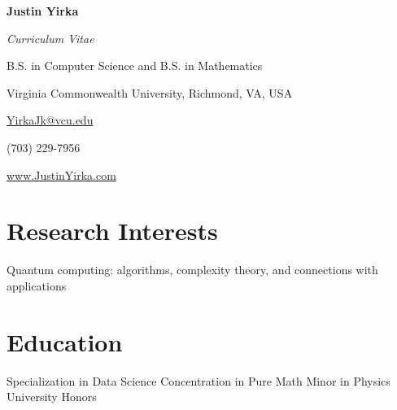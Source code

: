 \documentclass[11pt,letterpaper,serif]{moderncv}
\begin{document}
	
	
\thispagestyle{firstpage}

\begin{center}
	{\huge\textbf{Justin Yirka}}
	
	\textit{Curriculum Vitae}
	
	B.S. in Computer Science and B.S. in Mathematics
	
	Virginia Commonwealth University, Richmond, VA, USA
	\vspace{\baselineskip}
	
	\href{mailto:yirkajk@vcu.edu}{YirkaJk@vcu.edu}
	
	(703) 229-7956
	
	\url{www.JustinYirka.com}	
\end{center}


\setlength{\parskip}{0.5em}
\setlength\bibitemsep{\parskip}


\section{Research Interests}
Quantum computing: algorithms, complexity theory, and connections with applications


\section{Education}
\vspace{-\baselineskip}\vspace{-\parskip}
{	
	\begin{adjustwidth}{.25in}{}
		Specialization in Data Science \newline
		Concentration in Pure Math \newline 
		Minor in Physics \newline
		University Honors
	\end{adjustwidth}
}
\end{document}
